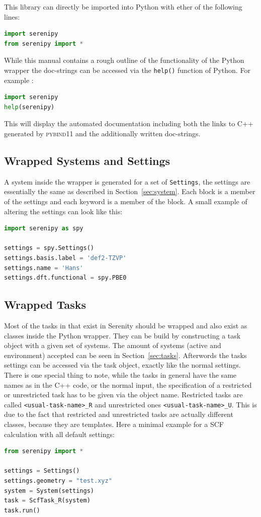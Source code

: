 \documentclass[bibliography=totocnumbered,a4paper,10pt]{scrartcl}
\begin{document}
This library can directly be imported into Python with ether of the following lines:
\begin{lstlisting}[language=Python]
import serenipy  
from serenipy import *
\end{lstlisting}
While this manual contains a rough outline of the functionality of the Python wrapper the doc-strings can be accessed via the 
\texttt{help()} function of Python. For example : 
\begin{lstlisting}[language=Python]
import serenipy
help(serenipy)
\end{lstlisting}
This will display the automated documentation including both the links to C++ generated by \textsc{pybind11} and the additionally written doc-strings.
\subsection{Wrapped Systems and Settings}
A system inside the wrapper is generated for a set of \texttt{Settings}, 
the settings are essentially the same as described in Section~\ref{sec:system}.
Each block is a member of the settings and each keyword is a member of the block.
A small example of altering the settings can look like this:
\begin{lstlisting}[language=Python]
import serenipy as spy

settings = spy.Settings()
settings.basis.label = 'def2-TZVP'
settings.name = 'Hans'
settings.dft.functional = spy.PBE0
\end{lstlisting}

\subsection{Wrapped Tasks}
Most of the tasks in that exist in Serenity should be wrapped and also exist as classes inside the Python wrapper. 
They can be build by constructing a task object with a given set of systems.
The amount of systems (active and environment) accepted can be seen in Section~\ref{sec:tasks}.
Afterwords the tasks settings can be accessed via the task object, exactly like the normal settings.
There is one special thing to note, while the tasks in general have the same names as in the C++ code, or the 
normal input, the specification of a restricted or unrestricted task has to be given via the object name.
Restricted tasks are called \texttt{<usual-task-name>\_R} and unrestricted ones \texttt{<usual-task-name>\_U}.
This is due to the fact that restricted and unrestricted tasks are actually different classes, because they are templates.
Here a minimal example for a SCF calculation with all default settings:
\begin{lstlisting}[language=Python]
from serenipy import *  
 
settings = Settings()  
settings.geometry = "test.xyz"
system = System(settings)  
task = ScfTask_R(system)  
task.run()  
\end{lstlisting}
\end{document}
